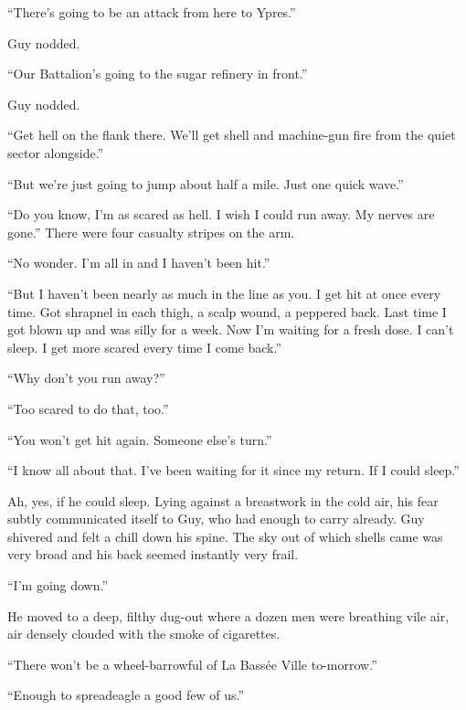 ``There's going to be an attack from here to Ypres.''

Guy nodded.

``Our Battalion's going to the sugar refinery in front.''

Guy nodded.

``Get hell on the flank there. We'll get shell and machine-gun fire from the quiet sector alongside.''

``But we're just going to jump about half a mile. Just one quick wave.''

``Do you know, I'm as scared as hell. I wish I could run away. My nerves are gone.'' There were four casualty stripes on the arm.

``No wonder. I'm all in and I haven't been hit.''

``But I haven't been nearly as much in the line as you. I get hit at once every time. Got shrapnel in each thigh, a scalp wound, a peppered back. Last time I got blown up and was silly for a week. Now I'm waiting for a fresh dose. I can't sleep. I get more scared every time I come back.''

``Why don't you run away?''

``Too scared to do that, too.''

``You won't get hit again. Someone else's turn.''

``I know all about that. I've been waiting for it since my return. If I could sleep.''

Ah, yes, if he could sleep. Lying against a breastwork in the cold air, his fear subtly communicated itself to Guy, who had enough to carry already. Guy shivered and felt a chill down his spine. The sky out of which shells came was very broad and his back seemed instantly very frail.

``I'm going down.''

He moved to a deep, filthy dug-out where a dozen men were breathing vile air, air densely clouded with the smoke of cigarettes.

``There won't be a wheel-barrowful of La Bass\'{e}e Ville to-morrow.''

``Enough to spreadeagle a good few of us.''

